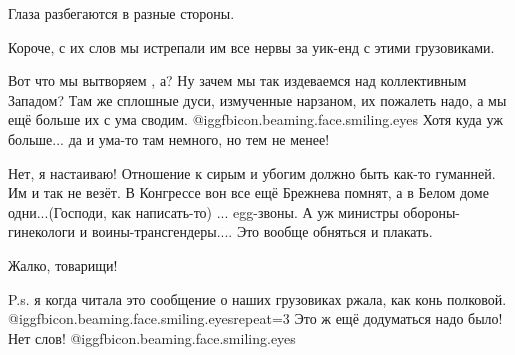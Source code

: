Глаза разбегаются в разные стороны.

Короче, с их слов мы истрепали им все нервы за уик-енд с этими грузовиками.

Вот что мы вытворяем , а? Ну зачем мы так издеваемся над коллективным Западом?
Там же сплошные дуси, измученные нарзаном, их пожалеть надо, а мы ещё больше их
с ума сводим.  @igg{fbicon.beaming.face.smiling.eyes} Хотя куда уж больше... да и ума-то там немного, но тем не
менее!

Нет, я настаиваю! Отношение к сирым и убогим должно быть как-то гуманней. Им и
так не везёт. В Конгрессе вон все ещё Брежнева помнят, а в Белом доме
одни...(Господи, как написать-то) ... egg-звоны. А уж министры
обороны-гинекологи и воины-трансгендеры.... Это вообще обняться и плакать.

Жалко, товарищи!

P.s. я когда читала это сообщение о наших грузовиках ржала, как конь
полковой. @igg{fbicon.beaming.face.smiling.eyes}{repeat=3}  Это ж ещё додуматься надо было! Нет слов! @igg{fbicon.beaming.face.smiling.eyes} 

